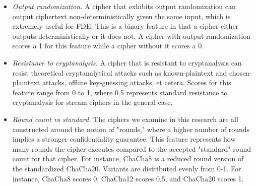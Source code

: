 \begin{itemize}

 \item \emph{Output randomization.} A cipher that exhibits output randomization
 can output ciphertext non-deterministically given the same input, which is
 extremely useful for FDE\@. This is a binary feature in that a cipher either
 outputs deterministically or it does not. A cipher with output randomization
 scores a 1 for this feature while a cipher without it scores a 0.

 \item \emph{Resistance to cryptanalysis.} A cipher that is resistant to
 cryptanalysis can resist theoretical cryptanalytical attacks such as
 known-plaintext and chosen-plaintext attacks, offline key-guessing attacks, et
 cetera. Scores for this feature range from 0 to 1, where 0.5 represents
 standard resistance to cryptanalysis for stream ciphers in the general case\@.

 \item \emph{Round count vs standard.} The ciphers we examine in this research
 are all constructed around the notion of "rounds," where a higher number of
 rounds implies a stronger confidentiality guarantee. This feature represents
 how many rounds the cipher executes compared to the accepted "standard" round
 count for that cipher. For instance, ChaCha8 is a reduced round version of the
 standardized ChaCha20. Variants are distributed evenly from 0-1. For instance,
 ChaCha8 scores 0, ChaCha12 scores 0.5, and ChaCha20 scores 1\@.

\end{itemize}

